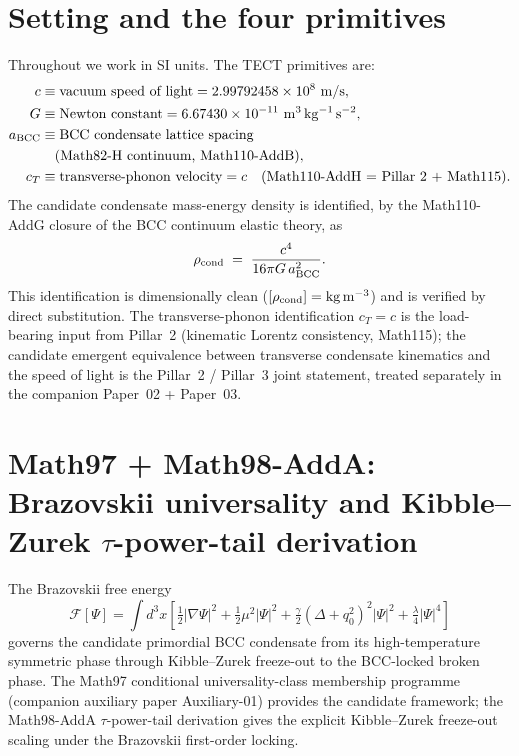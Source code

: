 \section{Setting and the four primitives}\label{sec:setting}

Throughout we work in SI units. The TECT primitives are:
\begin{align}
c &\equiv \text{vacuum speed of light} = 2.99792458\times 10^{8}~\mathrm{m/s},\\
G &\equiv \text{Newton constant} = 6.67430 \times 10^{-11}~\mathrm{m^3\,kg^{-1}\,s^{-2}},\\
a_{\rm BCC} &\equiv \text{BCC condensate lattice spacing}\nonumber\\
&\quad \text{(Math82-H continuum, Math110-AddB)},\\
c_T &\equiv \text{transverse-phonon velocity}
= c \quad \text{(Math110-AddH = Pillar 2 + Math115)}.
\end{align}
The candidate condensate mass-energy density is identified, by the
Math110-AddG closure of the BCC continuum elastic theory, as
\begin{equation}
\rho_{\rm cond} \;=\; \frac{c^4}{16\pi G\, a_{\rm BCC}^2}.
\label{eq:rho-cond}
\end{equation}
This identification is dimensionally clean
($[\rho_{\rm cond}] = \mathrm{kg\,m^{-3}}$) and is verified by direct
substitution. The transverse-phonon identification $c_T = c$ is the
load-bearing input from Pillar~2 (kinematic Lorentz consistency,
Math115); the candidate emergent equivalence between transverse
condensate kinematics and the speed of light is the Pillar~2 / Pillar~3
joint statement, treated separately in the companion Paper~02 +
Paper~03.

\section{Math97 + Math98-AddA: Brazovskii universality and Kibble--Zurek
$\tau$-power-tail derivation}\label{sec:KZ}

The Brazovskii free energy
\begin{equation}
\mathcal{F}[\Psi] = \int d^3 x \left[
\tfrac{1}{2}|\nabla\Psi|^2 + \tfrac{1}{2}\mu^2|\Psi|^2 +
\tfrac{\gamma}{2}(\Delta + q_0^2)^2|\Psi|^2 +
\tfrac{\lambda}{4}|\Psi|^4
\right]
\label{eq:brazovskii}
\end{equation}
governs the candidate primordial BCC condensate from its
high-temperature symmetric phase through Kibble--Zurek freeze-out
to the BCC-locked broken phase. The Math97 conditional
universality-class membership programme (companion auxiliary
paper Auxiliary-01) provides the candidate framework; the Math98-AddA
$\tau$-power-tail derivation gives the explicit Kibble--Zurek
freeze-out scaling under the Brazovskii first-order locking.

